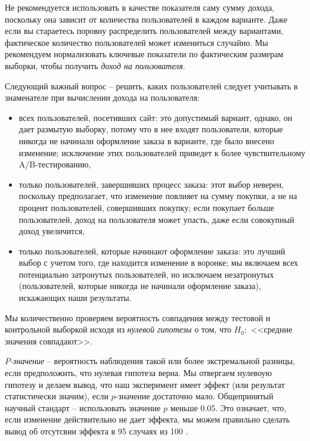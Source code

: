 \documentclass[%
	11pt,
	a4paper,
	utf8,
		]{article}
\begin{document}
Не рекомендуется использовать в качестве показателя саму сумму дохода, поскольку она зависит от количества пользователей в каждом варианте. Даже если вы стараетесь поровну распределить пользователей между вариантами, фактическое количество пользователей может измениться случайно. Мы рекомендуем нормализовать ключевые показатели по фактическим размерам выборки, чтобы получить \emph{доход на пользователя}. 

Следующий важный вопрос -- решить, каких пользователей следует учитывать в знаменателе при вычислении дохода на пользователя:
\begin{itemize}
	\item всех пользователей, посетивших сайт: это допустимый вариант, однако, он дает размытую выборку, потому что в нее входят пользователи, которые никогда не начинали оформление заказа в варианте, где было внесено изменение; исключение этих пользователей приведет к более чувствительному A/B-тестированию,
	
	\item только пользователей, завершивших процесс заказа: этот выбор неверен, поскольку предполагает, что изменение повлияет на сумму покупки, а не на процент пользователей, совершивших покупку; если покупает больше пользователей, доход на пользователя может упасть, даже если совокупный доход увеличится,
	
	\item только пользователей, которые начинают оформление заказа: это лучший выбор с учетом того, где находится изменение в воронке; мы включаем всех потенциально затронутых пользователей, но исключаем незатронутых (пользователей, которые никогда не начинали оформление заказа), искажающих наши результаты.
\end{itemize}

Мы количественно проверяем вероятность совпадения между тестовой и контрольной выборкой исходя из \emph{нулевой гипотезы} о том, что {\color{blue}$H_0: $ <<средние значения совпадают>>}.

\emph{$P$-значение} -- вероятность наблюдения такой или более экстремальной разницы, если предположить, что нулевая гипотеза верна. Мы отвергаем нулевоую гипотезу и делаем вывод, что наш эксперимент имеет эффект (или результат статистически значим), если $p$-значение достаточно мало. Общепринятый научный стандарт -- использовать значение $p$ меньше 0.05. Это означает, что, если изменение действительно не дает эффекта, мы можем правильно сделать вывод об отсутсвии эффекта в 95 случаях из 100 \cite[]{kohavi:ab-tests-2021}.
\end{document}
